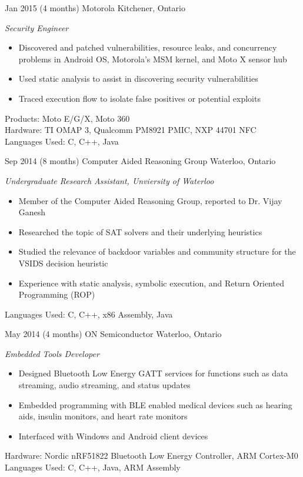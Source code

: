 \documentclass[print]{friggeri-cv} %
\begin{document}
\begin{entrylist}

\entry
{Jan 2015}
{(4 months)}
{Motorola}
{Kitchener, Ontario}
{\emph{Security Engineer}
\begin{itemize}
\item Discovered and patched vulnerabilities, resource leaks, and concurrency problems in Android OS, Motorola's MSM kernel, and Moto X sensor hub
\item Used static analysis to assist in discovering security vulnerabilities
\item Traced execution flow to isolate false positives or potential exploits
\end{itemize}
Products: Moto E/G/X, Moto 360 \\
Hardware: TI OMAP 3, Qualcomm PM8921 PMIC, NXP 44701 NFC \\
Languages Used: C, C++, Java \\
}

\entry
{Sep 2014}
{(8 months)}
{Computer Aided Reasoning Group}
{Waterloo, Ontario}
{\emph{Undergraduate Research Assistant, Unviersity of Waterloo}
\begin{itemize}
\item Member of the Computer Aided Reasoning Group, reported to Dr. Vijay Ganesh
\item Researched the topic of SAT solvers and their underlying heuristics
\item Studied the relevance of backdoor variables and community structure for the VSIDS decision heuristic
\item Experience with static analysis, symbolic execution, and Return Oriented Programming (ROP) 
\end{itemize}
Languages Used: C, C++, x86 Assembly, Java \\
}

\entry
{May 2014}
{(4 months)}
{ON Semiconductor}
{Waterloo, Ontario}
{\emph{Embedded Tools Developer}
\begin{itemize}
\item Designed Bluetooth Low Energy GATT services for functions such as data streaming, audio streaming, and status updates
\item Embedded programming with BLE enabled medical devices such as hearing aids, insulin monitors, and heart rate monitors
\item Interfaced with Windows and Android client devices
\end{itemize}
Hardware: Nordic nRF51822 Bluetooth Low Energy Controller, ARM Cortex-M0 \\
Languages Used: C, C++, Java, ARM Assembly \\
}


\end{entrylist}
\end{document}
